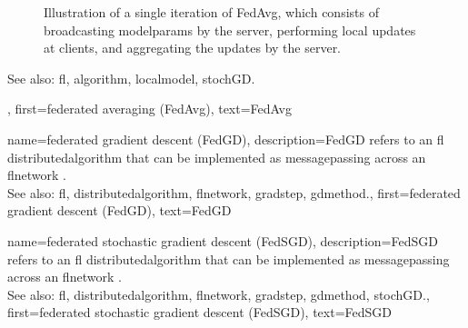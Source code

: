 {{\begin{figure}[H]
\begin{center}
			\end{center}
		\caption{Illustration of a single \gls{iteration} of FedAvg, which consists of broadcasting \glspl{modelparam} by the 
			server, performing local updates at clients, and aggregating the updates by the server. 
			\label{fig_single_iteration_fedavg_dict}} 
		\end{figure} 
		See also: \gls{fl}, \gls{algorithm}, \gls{localmodel}, \gls{stochGD}.},
	first={federated averaging (FedAvg)},
	text={FedAvg}
} 

{name={federated gradient descent (FedGD)},
	description={FedGD refers to  an \gls{fl} \gls{distributedalgorithm} that 
		can be implemented as \gls{messagepassing} across an \gls{flnetwork} \cite{JungFLBook}. 
		\\ 
		See also: \gls{fl}, \gls{distributedalgorithm}, \gls{flnetwork}, \gls{gradstep}, \gls{gdmethod}.},
	first={federated gradient descent (FedGD)},
	text={FedGD}
} 

{name={federated stochastic gradient descent (FedSGD)},
	description={FedSGD refers to an \gls{fl} \gls{distributedalgorithm} that 
		can be implemented as \gls{messagepassing} across an \gls{flnetwork} \cite{JungFLBook}. 
		\\ 
		See also: \gls{fl}, \gls{distributedalgorithm}, \gls{flnetwork}, \gls{gradstep}, \gls{gdmethod}, \gls{stochGD}.},
	first={federated stochastic gradient descent (FedSGD)},
	text={FedSGD}
} 

